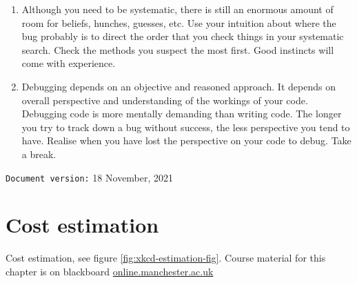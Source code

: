 \documentclass[
]{book}
\begin{document}
\begin{enumerate}
\item
  Although you need to be systematic, there is still an enormous amount of room for beliefs, hunches, guesses, etc. Use your intuition about where the bug probably is to direct the order that you check things in your systematic search. Check the methods you suspect the most first. Good instincts will come with experience.
\item
  Debugging depends on an objective and reasoned approach. It depends on overall perspective and understanding of the workings of your code. Debugging code is more mentally demanding than writing code. The longer you try to track down a bug without success, the less perspective you tend to have. Realise when you have lost the perspective on your code to debug. Take a break.
\end{enumerate}

\texttt{Document\ version:} 18 November, 2021

\hypertarget{estimating}{%
\chapter{Cost estimation}\label{estimating}}

Cost estimation, see figure \ref{fig:xkcd-estimation-fig}. Course material for this chapter is on blackboard \href{https://online.manchester.ac.uk}{online.manchester.ac.uk}
\end{document}
